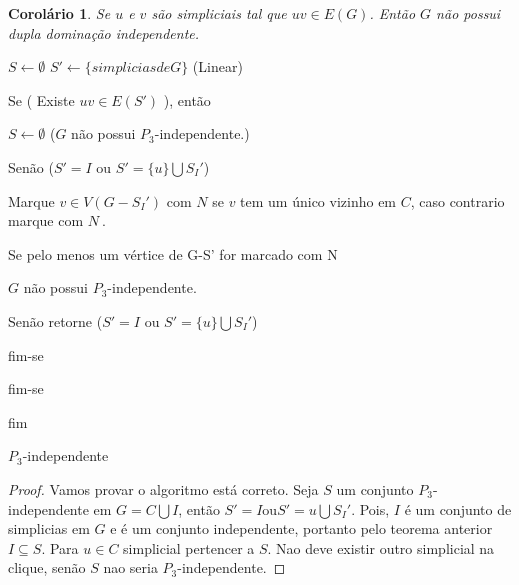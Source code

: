 \documentclass[a4paper,8pt]{article}
\theoremstyle{plain}
\newtheorem{corollary}{Corolário}[section]
\begin{document}
\begin{corollary}
Se $u$ e $v$ são simpliciais tal que $uv \in E(G)$. Então $G$ não possui dupla dominação independente. 
\end{corollary}



\label{sec:parameter2}

\begin{algorithm}[!htb] \label{alg:hn1}
	
	$S \leftarrow \emptyset$
    $S' \leftarrow \{simplicias de G\}$ (Linear)
	
	Se ( Existe $uv \in E(S')$ ), então 
		
		$S \leftarrow \emptyset$ ($G$ não possui $P_3$-independente.)
		
	Senão ($S'=I$ ou $S'=	\{u\}\bigcup S_I'$)
	
	Marque $v \in V(G-S_I')$ com $N$ se $v$ tem um único vizinho em $C$,
caso contrario marque com $N^{~}$. 
   
		Se pelo menos um vértice de G-S' for marcado com N
		
	  $G$ não possui $P_3$-independente.
	  
        Senão retorne ($S'=I $ ou $ S'=	\{u\}\bigcup S_I'$)
        
	fim-se
	
	fim-se
	
	fim
	\caption{$P_3$-independente}
	\label{alg:general1}
\end{algorithm}

\begin{proof}
 Vamos provar o algoritmo está correto. Seja $S$ um conjunto $P_3$-independente em $G=C\bigcup I$, então $S'=I $ou$ S'=	{u}\bigcup S_I'$. Pois, $I$ é um conjunto de simplicias em $G$ e é um conjunto independente, portanto pelo teorema anterior $I\subseteq S$. Para $u\in C$ simplicial pertencer a $S$. Nao deve existir outro simplicial na clique, senão $S$ nao seria $P_3$-independente. 
\end{proof}





\label{sec:parameter}
\end{document}
